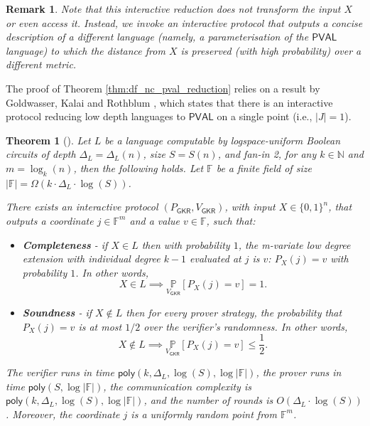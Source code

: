 \documentclass[10pt,a4paper]{article}
\newtheorem{theorem}{Theorem}[section]
\newtheorem{remark}{Remark}
\newcommand{\poly}{\mathsf{poly}}
\newcommand{\PVAL}{\mathsf{PVAL}}
\newcommand{\GKR}{\mathsf{GKR}}
\newcommand{\F}{\mathbb{F}}
\newcommand{\N}{\mathbb{N}}
\begin{document}
\begin{remark}
Note that this interactive reduction does \emph{not} transform the input $X$ or even \textit{access} it. Instead, we invoke an interactive protocol that outputs a concise description of a different language (namely, a parameterisation of the $\PVAL$ language) to which the distance from $X$ is preserved (with high probability) over a different metric.
\end{remark}

The proof of Theorem \ref{thm:df_nc_pval_reduction}  relies on a result by Goldwasser, Kalai and Rothblum \cite{GKR15}, which states that there is an interactive protocol reducing low depth languages to $\PVAL$ on a single point (i.e., $\vert J\vert =1$).

\begin{theorem}[\cite{GKR15}]
\label{thm:gkr_red}
Let $L$ be a language computable by logspace-uniform  Boolean circuits of depth $\Delta_{L}=\Delta_{L}(n)$, size $S=S(n)$, and fan-in 2, for any $k\in \N$ and $m=\log_{k}(n)$, then the following holds. Let $\F$ be a finite field of size $|\F|= \Omega(k\cdot \Delta_{L}\cdot\log (S))$. 

There exists an interactive protocol $(P_{\GKR}, V_{\GKR})$, with input $X \in \{0,1\}^n$, that outputs a coordinate $j\in \mathbb{F}^{m}$ and a value $v\in \mathbb{F}$, such that:
\begin{itemize}
    \item \textbf{Completeness} - if $X\in L$ then with probability $1$, the m-variate low degree extension with individual degree $k-1$ evaluated at $j$ is $v$: $P_X(j)=v$ with probability $1$. In other words,
    \begin{equation*}
        X\in L \implies \underset{{V_{\GKR}}}{\mathbb{P}}[P_X(j)=v]=1.
    \end{equation*}
    
    \item \textbf{Soundness} - if $X\not\in L$ then  for every prover strategy, the probability that $P_X(j)=v$ is at most $1/2$ over the verifier's randomness. In other words,
    \begin{equation*}
        X\not\in L\implies \underset{{V_{\GKR}}}{\mathbb{P}}[P_X(j)=v]\leq \frac{1}{2}.
    \end{equation*}
\end{itemize}

The verifier runs in time $\poly(k,\Delta_{L},\log (S),\log |\F|)$, the prover runs in time $\poly(S,\log|\F|)$, the communication complexity is $\poly(k,\Delta_{L}, \log (S),\log |\F|)$, and the number of rounds is $O(\Delta_{L} \cdot \log(S))$. Moreover, the coordinate $j$ is a uniformly random point from $\F^m$.
\end{theorem}
\end{document}
